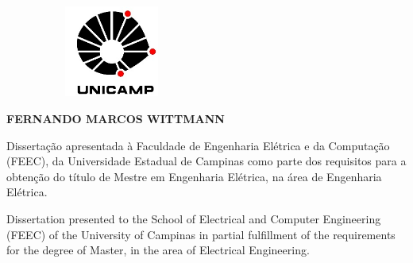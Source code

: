 
\newpage

\thispagestyle{plain}

\includegraphics[width=7cm, height=3cm,keepaspectratio=true]{imgs/logo}
\begin{center}
  {
  \large\textbf{\textsc{FERNANDO MARCOS WITTMANN}}
  
  }
\end{center}




\vspace{1cm}

\begin{center}
  {\large\textbf{\textsc{\titulobr}}}
\end{center}


\begin{center}
  {\large\textbf{\textsc{\titulo}}}
\end{center}

\vfill


\vspace{1cm}
\begin{flushright}
  \begin{minipage}[c]{.5\textwidth}
    Dissertação apresentada à Faculdade de Engenharia Elétrica e da Computação (FEEC), da Universidade Estadual de Campinas como parte dos requisitos para a obtenção do título de Mestre em Engenharia Elétrica, na área de Engenharia Elétrica.
  \end{minipage}
\end{flushright}

\begin{flushright}
  \begin{minipage}[c]{.5\textwidth}
Dissertation presented to the School of Electrical and Computer Engineering (FEEC) of the University of Campinas in partial fulfillment of the requirements for the degree of Master, in the area of Electrical Engineering. 
  \end{minipage}
\end{flushright}
\vspace{1cm}


